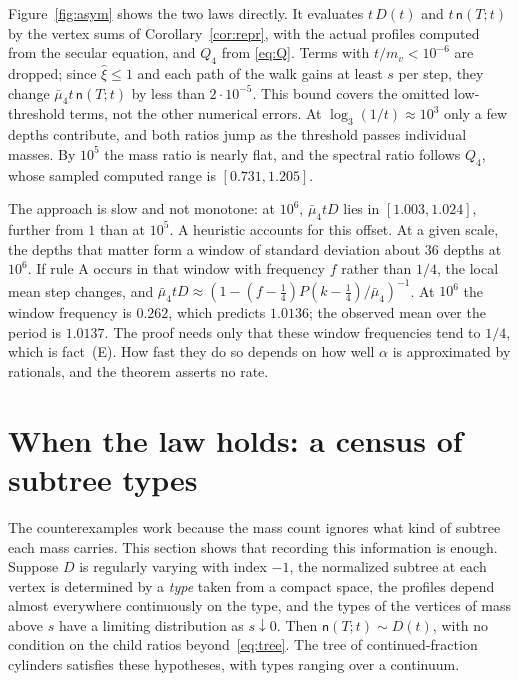 \documentclass[11pt]{article}
\theoremstyle{definition}
\theoremstyle{remark}
\newcommand{\ncount}{\mathsf n}
\begin{document}
Figure~\ref{fig:asym} shows the two laws directly. It evaluates
$t\,D(t)$ and $t\,\ncount(T;t)$ by the vertex sums of
Corollary~\ref{cor:repr}, with the actual profiles computed from the
secular equation, and $Q_4$ from \eqref{eq:Q}. Terms with $t/m_v<10^{-6}$
are dropped; since $\widehat\xi\le1$ and each path of the walk gains at least $s$ per step, they change $\bar\mu_4t\,\ncount(T;t)$ by less than
$2\cdot10^{-5}$. This bound covers the omitted low-threshold terms,
not the other numerical errors. At $\log_3(1/t)\approx10^3$ only a few depths contribute,
and both ratios jump as the threshold passes individual masses. By
$10^5$ the mass ratio is nearly flat, and the spectral ratio follows
$Q_4$, whose sampled computed range is $[0.731,1.205]$.

The approach is slow and not monotone: at $10^6$, $\bar\mu_4tD$ lies in
$[1.003,1.024]$, further from $1$ than at $10^5$. A heuristic accounts
for this offset. At a given scale, the depths that matter form a window
of standard deviation about $36$ depths at $10^6$. If rule A occurs in
that window with frequency $f$ rather than $1/4$, the local mean step
changes, and $\bar\mu_4tD\approx(1-(f-\frac14)P(k-\frac14)/\bar\mu_4)^{-1}$.
At $10^6$ the window frequency is $0.262$, which predicts $1.0136$; the
observed mean over the period is $1.0137$. The proof needs only that
these window frequencies tend to $1/4$, which is fact~(E). How fast they
do so depends on how well $\alpha$ is approximated by rationals, and
the theorem asserts no rate.

\section{When the law holds: a census of subtree types}\label{sec:positive}

The counterexamples work because the mass count ignores what kind of
subtree each mass carries. This section shows that recording this
information is enough. Suppose $D$ is regularly varying with index $-1$,
the normalized subtree at each vertex is determined by a \emph{type}
taken from a compact space, the profiles depend almost everywhere
continuously on the type, and the types of the vertices of mass above
$s$ have a limiting distribution as $s\downarrow0$. Then
$\ncount(T;t)\sim D(t)$, with no condition on the child ratios
beyond~\eqref{eq:tree}. The tree of continued-fraction cylinders
satisfies these hypotheses, with types ranging over a continuum.
\end{document}
